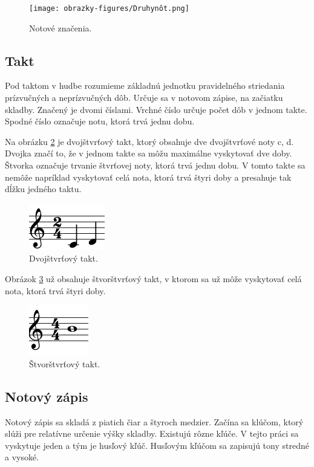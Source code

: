 \begin{figure}[H]
\centering
\texttt{[image: obrazky-figures/Druhynôt.png]}
\caption{Notové značenia.}
\label{fig:druhnot}
\end{figure}

\subsection{Takt}
Pod taktom v hudbe rozumieme základnú jednotku pravidelného striedania prízvučných a neprízvučných dôb. Určuje sa v notovom zápise, na začiatku skladby. Značený je dvomi číslami. Vrchné číslo určuje počet dôb v jednom takte. Spodné číslo označuje notu, ktorá trvá jednu dobu.

Na obrázku \ref{fig:dvojst} je dvojštvrťový takt, ktorý obsahuje dve dvojštvrťové noty c, d. Dvojka značí to, že v jednom takte sa môžu maximálne vyskytovať dve doby. Štvorka označuje trvanie štvrťovej noty, ktorá trvá jednu dobu. V tomto takte sa nemôže napríklad vyskytovať celá nota, ktorá trvá štyri doby a presahuje tak dĺžku jedného taktu.

\begin{figure}[H]
\centering
\includegraphics[scale=0.4]{obrazky-figures/dvojst.png}
\caption{Dvojštvrťový takt.}
\label{fig:dvojst}
\end{figure}


Obrázok \ref{fig:trojst} už obsahuje štvorštvrťový takt, v ktorom sa už môže vyskytovať celá nota, ktorá trvá štyri doby.

\begin{figure}[H]
\centering
\includegraphics[scale=0.4]{obrazky-figures/cela.png}
\caption{Štvorštvrťový takt.}
\label{fig:trojst}
\end{figure}

\subsection{Notový zápis}
Notový zápis sa skladá z piatich čiar a štyroch medzier. Začína sa klúčom, ktorý slúži pre relatívne určenie výšky skladby. Existujú rôzne kľúče. V tejto práci sa vyskytuje jeden a tým je husľový kľúč. Husľovým kľúčom sa zapisujú tony stredné a vysoké. 

